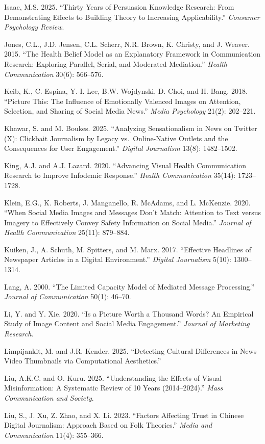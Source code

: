 \documentclass[
  12pt,
]{article}
\begin{document}
Isaac, M.S. 2025. ``Thirty Years of Persuasion Knowledge Research: From
Demonstrating Effects to Building Theory to Increasing Applicability.''
\emph{Consumer Psychology Review}.

Jones, C.L., J.D. Jensen, C.L. Scherr, N.R. Brown, K. Christy, and J.
Weaver. 2015. ``The Health Belief Model as an Explanatory Framework in
Communication Research: Exploring Parallel, Serial, and Moderated
Mediation.'' \emph{Health Communication} 30(6): 566--576.

Keib, K., C. Espina, Y.-I. Lee, B.W. Wojdynski, D. Choi, and H. Bang.
2018. ``Picture This: The Influence of Emotionally Valenced Images on
Attention, Selection, and Sharing of Social Media News.'' \emph{Media
Psychology} 21(2): 202--221.

Khawar, S. and M. Boukes. 2025. ``Analyzing Sensationalism in News on
Twitter (X): Clickbait Journalism by Legacy vs.~Online-Native Outlets
and the Consequences for User Engagement.'' \emph{Digital Journalism}
13(8): 1482--1502.

King, A.J. and A.J. Lazard. 2020. ``Advancing Visual Health
Communication Research to Improve Infodemic Response.'' \emph{Health
Communication} 35(14): 1723--1728.

Klein, E.G., K. Roberts, J. Manganello, R. McAdams, and L. McKenzie.
2020. ``When Social Media Images and Messages Don't Match: Attention to
Text versus Imagery to Effectively Convey Safety Information on Social
Media.'' \emph{Journal of Health Communication} 25(11): 879--884.

Kuiken, J., A. Schuth, M. Spitters, and M. Marx. 2017. ``Effective
Headlines of Newspaper Articles in a Digital Environment.''
\emph{Digital Journalism} 5(10): 1300--1314.

Lang, A. 2000. ``The Limited Capacity Model of Mediated Message
Processing.'' \emph{Journal of Communication} 50(1): 46--70.

Li, Y. and Y. Xie. 2020. ``Is a Picture Worth a Thousand Words? An
Empirical Study of Image Content and Social Media Engagement.''
\emph{Journal of Marketing Research}.

Limpijankit, M. and J.R. Kender. 2025. ``Detecting Cultural Differences
in News Video Thumbnails via Computational Aesthetics.''

Liu, A.K.C. and O. Kuru. 2025. ``Understanding the Effects of Visual
Misinformation: A Systematic Review of 10 Years (2014--2024).''
\emph{Mass Communication and Society}.

Liu, S., J. Xu, Z. Zhao, and X. Li. 2023. ``Factors Affecting Trust in
Chinese Digital Journalism: Approach Based on Folk Theories.''
\emph{Media and Communication} 11(4): 355--366.
\end{document}
